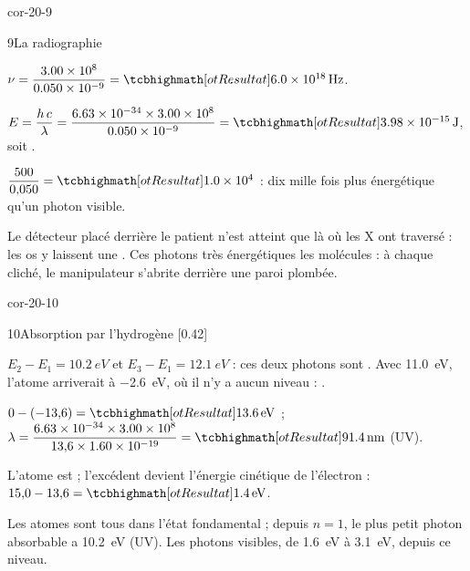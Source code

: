 \begin{blocLivre}{cor-20-9}
\begin{corrige}{9}{La radiographie}
\begin{questions}
\item $\nu=\dfrac{\num{3,00e8}}{\num{0,050e-9}}=\res{\qty{6,0e18}{Hz}}$.
\item $E=\dfrac{h\,c}{\lambda}=\dfrac{\num{6,63e-34}\times\num{3,00e8}}{\num{0,050e-9}}=\res{\qty{3,98e-15}{J}}$, soit .
\item $\dfrac{500}{0{,}050}=\res{\num{1,0e4}}$ : dix mille fois plus énergétique qu'un photon visible.
\item Le détecteur placé derrière le patient n'est atteint que là où les X ont traversé : les os y laissent une . Ces photons
très énergétiques  les molécules : à chaque cliché, le manipulateur s'abrite derrière une paroi plombée.
\end{questions}
\end{corrige}
\end{blocLivre}
\begin{blocLivre}{cor-20-10}
\begin{corrige}{10}{Absorption par l'hydrogène}
[0.42]{\begin{questions}
\item $E_2-E_1=\qty{10,2}{eV}$ et $E_3-E_1=\qty{12,1}{eV}$ : ces deux photons sont . Avec \qty{11,0}{eV}, l'atome arriverait à
\qty{-2,6}{eV}, où il n'y a aucun niveau : .
\item $0-(-13{,}6)=\res{\qty{13,6}{eV}}$ ; $\lambda=\dfrac{\num{6,63e-34}\times\num{3,00e8}}{13{,}6\times\num{1,60e-19}}=\res{\qty{91,4}{nm}}$ (UV).
\item L'atome est  ; l'excédent devient l'énergie cinétique de l'électron : $15{,}0-13{,}6=\res{\qty{1,4}{eV}}$.
\item Les atomes sont tous dans l'état fondamental ; depuis $n=1$, le plus petit photon absorbable a \qty{10,2}{eV} (UV). Les photons visibles,
de \qty{1,6}{eV} à \qty{3,1}{eV},  depuis ce niveau.
\end{questions}}
\end{corrige}
\end{blocLivre}
